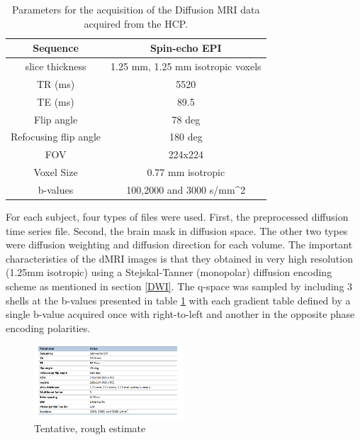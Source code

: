 \documentclass[msthesis.tex]{subfiles}
\begin{document}
\begin{table}[]
\centering
    \begin{tabular}{|c|c|}
         \hline
         Sequence &  Spin-echo EPI \\
         \hline
         slice thickness & 1.25 mm, 1.25 mm isotropic voxels\\
          \hline
         TR (ms) & 5520  \\
          \hline
         TE (ms) & 89.5 \\
          \hline
         Flip angle & 78 deg \\
          \hline
         Refocusing flip angle & 180 deg \\
          \hline
         FOV & 224x224 \\
          \hline
         Voxel Size & 0.77 mm isotropic \\
          \hline
         b-values & 100,2000 and 3000 s/mm^2\\
          \hline
    \end{tabular}
    \caption{Parameters for the acquisition of the Diffusion MRI data acquired from the HCP.}
    \label{tab:diffusionmripara}
\end{table}
For each subject, four types of files were used. First, the preprocessed diffusion time series file. Second, the brain mask in diffusion space. The other two types were diffusion weighting and diffusion direction for each volume. The important characteristics of the dMRI images is that they obtained in very high resolution (1.25mm isotropic) using a Stejskal-Tanner (monopolar) diffusion encoding scheme as mentioned in section \ref{DWI}. The q-space was sampled by including 3 shells at the b-values presented in table \ref{tab:diffusionmripara} with each gradient table defined by a single b-value acquired once with right-to-left and another in the opposite phase encoding polarities. 

 
\begin{figure}
    \centering
    \includegraphics[width=0.5\textwidth]{images/dmri_resolution.png}
    \caption{Tentative, rough estimate}
    \label{fig:dmriaq}
\end{figure}
\end{document}
